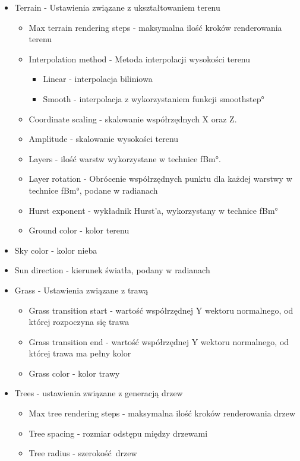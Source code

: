 \begin{itemize}
\item Terrain - Ustawienia związane z ukształtowaniem terenu
  \begin{itemize}
    \item Max terrain rendering steps - maksymalna ilość kroków renderowania terenu
    \item Interpolation method - Metoda interpolacji wysokości terenu
      \begin{itemize}
        \item Linear - interpolacja biliniowa
        \item Smooth - interpolacja z wykorzystaniem funkcji \ang{smoothstep}
      \end{itemize}
    \item Coordinate scaling - skalowanie współrzędnych X oraz Z.
    \item Amplitude - skalowanie wysokości terenu
    \item Layers - ilość warstw wykorzystane w technice \ang{fBm}.
    \item Layer rotation - Obrócenie współrzędnych punktu dla każdej warstwy w technice \ang{fBm}, podane w radianach
    \item Hurst exponent - wykładnik Hurst'a, wykorzystany w technice \ang{fBm}
    \item Ground color - kolor terenu
  \end{itemize}
\item Sky color - kolor nieba
\item Sun direction - kierunek światła, podany w radianach
\item Grass - Ustawienia związane z trawą
  \begin{itemize}
    \item Grass transition start - wartość współrzędnej Y wektoru normalnego, od której rozpoczyna się trawa
    \item Grass transition end - wartość współrzędnej Y wektoru normalnego, od której trawa ma pełny kolor
    \item Grass color - kolor trawy
  \end{itemize}
\item Trees - ustawienia związane z generacją drzew
  \begin{itemize}
    \item Max tree rendering steps - maksymalna ilość kroków renderowania drzew
    \item Tree spacing - rozmiar odstępu między drzewami
    \item Tree radius - szerokość drzew

\end{itemize}
\end{itemize}
